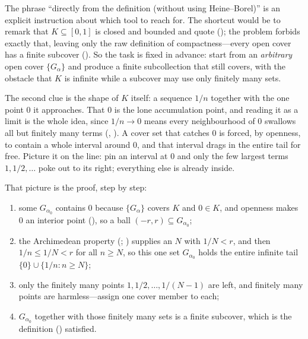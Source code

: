 \documentclass[main.tex]{subfiles}
\begin{document}
\begin{Reflection}
The phrase ``directly from the definition (without using Heine--Borel)'' is an explicit instruction
about which tool to reach for. The shortcut would be to remark that $K\subseteq[0,1]$ is closed and
bounded and quote  (); the problem forbids exactly that,
leaving only the raw definition of compactness---every open cover has a finite subcover ().
So the task is fixed in advance: start from an \emph{arbitrary} open cover $\{G_\alpha\}$ and produce a
finite subcollection that still covers, with the obstacle that $K$ is infinite while a subcover may use
only finitely many sets.

The second clue is the shape of $K$ itself: a sequence $1/n$ together with the one point $0$ it
approaches. That $0$ is the lone accumulation point, and reading it as a limit is the whole idea, since
$1/n\to 0$ means every neighbourhood of $0$ swallows all but finitely many terms
(, ). A cover set that
catches $0$ is forced, by openness, to contain a whole interval around $0$, and that interval drags in
the entire tail for free. Picture it on the line: pin an interval at $0$ and only the few largest terms
$1,1/2,\ldots$ poke out to its right; everything else is already inside.

That picture is the proof, step by step:
\begin{enumerate}[leftmargin=1.7em,itemsep=3pt,topsep=2pt,label=\textnormal{(\arabic*)}]
  \item some $G_{\alpha_0}$ contains $0$ because $\{G_\alpha\}$ covers $K$ and $0\in K$, and openness
        makes $0$ an interior point (), so a ball $(-r,r)\subseteq G_{\alpha_0}$;
  \item the Archimedean property (; ) supplies an
        $N$ with $1/N<r$, and then $1/n\le 1/N<r$ for all $n\ge N$, so this one set $G_{\alpha_0}$ holds
        the entire infinite tail $\{0\}\cup\{1/n:n\ge N\}$;
  \item only the finitely many points $1,1/2,\ldots,1/(N-1)$ are left, and finitely many points are
        harmless---assign one cover member to each;
  \item $G_{\alpha_0}$ together with those finitely many sets is a finite subcover, which is the
        definition () satisfied.
\end{enumerate}


\end{Reflection}
\end{document}
